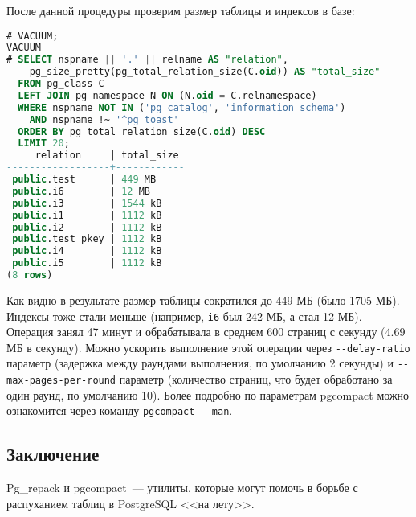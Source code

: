 После данной процедуры проверим размер таблицы и индексов в базе:

\begin{lstlisting}[language=SQL,label=lst:pgcompactor9,caption=Размер таблицы и индексов]
# VACUUM;
VACUUM
# SELECT nspname || '.' || relname AS "relation",
    pg_size_pretty(pg_total_relation_size(C.oid)) AS "total_size"
  FROM pg_class C
  LEFT JOIN pg_namespace N ON (N.oid = C.relnamespace)
  WHERE nspname NOT IN ('pg_catalog', 'information_schema')
    AND nspname !~ '^pg_toast'
  ORDER BY pg_total_relation_size(C.oid) DESC
  LIMIT 20;
     relation     | total_size
------------------+------------
 public.test      | 449 MB
 public.i6        | 12 MB
 public.i3        | 1544 kB
 public.i1        | 1112 kB
 public.i2        | 1112 kB
 public.test_pkey | 1112 kB
 public.i4        | 1112 kB
 public.i5        | 1112 kB
(8 rows)
\end{lstlisting}

Как видно в результате размер таблицы сократился до 449 МБ (было 1705 МБ). Индексы тоже стали меньше (например, \lstinline!i6! был 242 МБ, а стал 12 МБ). Операция занял 47 минут и обрабатывала в среднем 600 страниц с секунду (4.69 МБ в секунду). Можно ускорить выполнение этой операции через \lstinline!--delay-ratio! параметр (задержка между раундами выполнения, по умолчанию 2 секунды) и \lstinline!--max-pages-per-round! параметр (количество страниц, что будет обработано за один раунд, по умолчанию 10). Более подробно по параметрам pgcompact можно ознакомится через команду \lstinline!pgcompact --man!.


\subsection{Заключение}

Pg\_repack и pgcompact~--- утилиты, которые могут помочь в борьбе с распуханием таблиц в PostgreSQL <<на лету>>.
